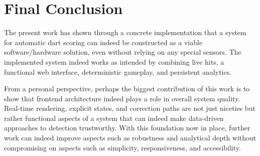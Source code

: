 \section{Final Conclusion}
The present work has shown through a concrete implementation that a system for automatic dart scoring can indeed be constructed as a viable software/hardware solution, even without relying on any special sensors. The implemented system indeed works as intended by combining live hits, a functional web interface, deterministic gameplay, and persistent analytics.

From a personal perspective, perhaps the biggest contribution of this work is to show that frontend architecture indeed plays a role in overall system quality. Real-time rendering, explicit states, and correction paths are not just niceties but rather functional aspects of a system that can indeed make data-driven approaches to detection trustworthy. With this foundation now in place, further work can indeed improve aspects such as robustness and analytical depth without compromising on aspects such as simplicity, responsiveness, and accessibility.